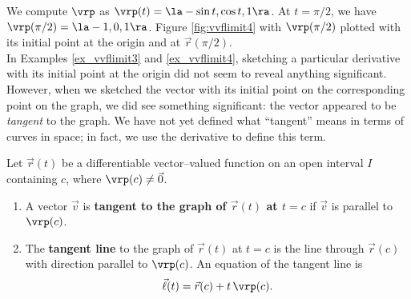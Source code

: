 {We compute $\vrp$ as $\vrp(t) = \la -\sin t, \cos t, 1\ra$. At $t= \pi/2$, we have $\vrp(\pi/2) = \la -1,0,1\ra$. Figure \ref{fig:vvflimit4}  with $\vrp(\pi/2)$ plotted with its initial point at the origin and at $\vec r(\pi/2)$.
{ %
}%
}\\  %

In Examples \ref{ex_vvflimit3} and \ref{ex_vvflimit4}, sketching a particular derivative with its initial point at the origin did not seem to reveal anything significant. However, when we sketched the vector with its initial point on the corresponding point on the graph, we did see something significant: the vector appeared to be \textit{tangent} to the graph. We have not yet defined what ``tangent'' means in terms of curves in space; in fact, we use the derivative to define this term.

{Let $\vec r(t)$ be a differentiable vector--valued function on an open interval $I$ containing $c$, where $\vrp(c)\neq \vec 0$.
\begin{enumerate}
	\item A vector $\vec v$ is \textbf{tangent to the graph of $\vec r(t)$ at $t=c$} if $\vec v$ is parallel to $\vrp(c)$.
	\item	The \textbf{tangent line}  to the graph of $\vec r(t)$ at $t=c$ is the line through $\vec r(c)$ with direction parallel to $\vrp(c)$. An equation of the tangent line is 
	$$\vec \ell(t) = \vec r(c) + t\,\vrp(c).$$
\end{enumerate}
}\\

